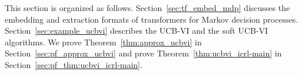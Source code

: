 \documentclass[10pt]{article}
\DeclareMathOperator*{\argmax}{arg\,max}
\newcommand{\<}{\left\langle}
\renewcommand{\>}{\right\rangle}
\newcommand{\E}{\mathbb{E}}
\newcommand{\R}{\mathbb{R}}
\newcommand{\inst}{{\mathsf{M}}}
\newcommand{\state}{{s}}
\newcommand{\action}{{a}}
\newcommand{\reward}{{r}}
\newcommand{\totlen}{{T}} %
\newcommand{\sAlg}{{\mathsf{Alg}}}
\newcommand{\dset}{{D}}
\newcommand{\plc}{{\pi}}
\newcommand{\plcset}{{\Pi}}
\newcommand{\optplc}{{\pi^*}}
\newcommand{\prior}{{\Lambda}}
\newcommand{\Numepi}{{K}}
\newcommand{\horizon}{{H}}
\newcommand{\statesp}{{\mathcal{S}}}
\newcommand{\actionsp}{{\mathcal{A}}}
\renewcommand{\horizon}{{H}}
\newcommand{\transit}{{P}}
\newcommand{\rewardfun}{{R}}
\newcommand{\init}{{\mu_1}}
\newcommand{\valuefun}{{V}}
\newcommand{\totreward}{{\mathfrak{R}}}  %
\newcommand{\Numst}{{S}}
\newcommand{\Numact}{{A}}
\newcommand{\Vfun}{{\valuefun}}
\begin{document}
This section is organized as follows. Section~\ref{sec:tf_embed_mdp} discusses the embedding and extraction formats of transformers for Markov decision processes. Section~\ref{sec:example_ucbvi} describes the UCB-VI and the soft UCB-VI algorithms.  We prove Theorem~\ref{thm:approx_ucbvi} in Section~\ref{sec:pf_approx_ucbvi} and prove Theorem~\ref{thm:ucbvi_icrl-main} in Section~\ref{sec:pf_thm:ucbvi_icrl-main}. 





\end{document}
